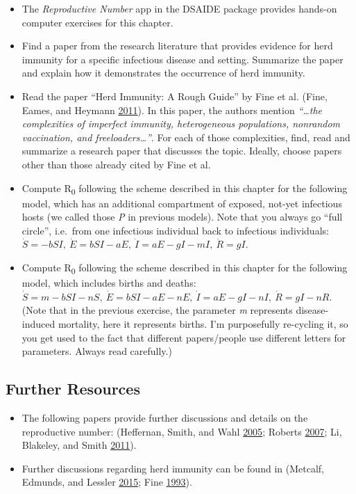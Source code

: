 \documentclass[]{article}
\providecommand{\tightlist}{%
  \setlength{\itemsep}{0pt}\setlength{\parskip}{0pt}}
\theoremstyle{definition}
\theoremstyle{definition}
\theoremstyle{definition}
\theoremstyle{remark}
\begin{document}
\begin{itemize}
\tightlist
\item
  The \emph{Reproductive Number} app in the DSAIDE package provides
  hands-on computer exercises for this chapter.
\item
  Find a paper from the research literature that provides evidence for
  herd immunity for a specific infectious disease and setting. Summarize
  the paper and explain how it demonstrates the occurrence of herd
  immunity.
\item
  Read the paper ``Herd Immunity: A Rough Guide'' by Fine et al. (Fine,
  Eames, and Heymann \protect\hyperlink{ref-fine11}{2011}). In this
  paper, the authors mention \emph{``\ldots{}the complexities of
  imperfect immunity, heterogeneous populations, nonrandom vaccination,
  and freeloaders\ldots{}''}. For each of those complexities, find, read
  and summarize a research paper that discusses the topic. Ideally,
  choose papers other than those already cited by Fine et al.
\item
  Compute R\textsubscript{0} following the scheme described in this
  chapter for the following model, which has an additional compartment
  of exposed, not-yet infectious hosts (we called those \emph{P} in
  previous models). Note that you always go ``full circle'', i.e.~from
  one infectious individual back to infectious individuals:
  \(\dot S = -b SI, \ \dot E = b S I - a E, \ \dot I = a E - g I - m I, \ \dot R = g I\).
\item
  Compute R\textsubscript{0} following the scheme described in this
  chapter for the following model, which includes births and deaths:
  \(\dot S =m - b SI - n S, \ \dot E = b S I - a E - n E, \ \dot I = a E - g I - n I, \ \dot R = g I - n R\).
  (Note that in the previous exercise, the parameter \emph{m} represents
  disease-induced mortality, here it represents births. I'm purposefully
  re-cycling it, so you get used to the fact that different
  papers/people use different letters for parameters. Always read
  carefully.)
\end{itemize}

\subsection{Further Resources}\label{further-resources-3}

\begin{itemize}
\tightlist
\item
  The following papers provide further discussions and details on the
  reproductive number: (Heffernan, Smith, and Wahl
  \protect\hyperlink{ref-heffernan05}{2005}; Roberts
  \protect\hyperlink{ref-roberts07}{2007}; Li, Blakeley, and Smith
  \protect\hyperlink{ref-li11}{2011}).
\item
  Further discussions regarding herd immunity can be found in (Metcalf,
  Edmunds, and Lessler \protect\hyperlink{ref-metcalf15}{2015}; Fine
  \protect\hyperlink{ref-fine93}{1993}).
\end{itemize}
\end{document}
